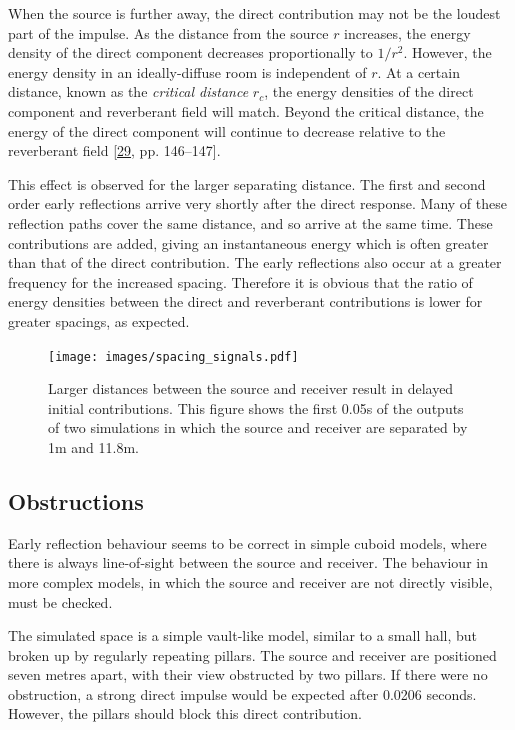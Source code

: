 \documentclass[]{scrreprt}
\begin{document}
When the source is further away, the direct contribution may not be the
loudest part of the impulse. As the distance from the source \(r\)
increases, the energy density of the direct component decreases
proportionally to \(1/r^2\). However, the energy density in an
ideally-diffuse room is independent of \(r\). At a certain distance,
known as the \emph{critical distance} \(r_c\), the energy densities of
the direct component and reverberant field will match. Beyond the
critical distance, the energy of the direct component will continue to
decrease relative to the reverberant field
{[}\protect\hyperlink{ref-kuttruffux5froomux5f2009}{29}, pp.
146--147{]}.

This effect is observed for the larger separating distance. The first
and second order early reflections arrive very shortly after the direct
response. Many of these reflection paths cover the same distance, and so
arrive at the same time. These contributions are added, giving an
instantaneous energy which is often greater than that of the direct
contribution. The early reflections also occur at a greater frequency
for the increased spacing. Therefore it is obvious that the ratio of
energy densities between the direct and reverberant contributions is
lower for greater spacings, as expected.

\begin{figure}[htbp]
\centering
\texttt{[image: images/spacing\_signals.pdf]}
\caption{Larger distances between the source and receiver result in
delayed initial contributions. This figure shows the first 0.05s of the
outputs of two simulations in which the source and receiver are
separated by 1m and 11.8m.\label{fig:spacing_signals}}
\end{figure}

\subsection{Obstructions}\label{obstructions}

Early reflection behaviour seems to be correct in simple cuboid models,
where there is always line-of-sight between the source and receiver. The
behaviour in more complex models, in which the source and receiver are
not directly visible, must be checked.

The simulated space is a simple vault-like model, similar to a small
hall, but broken up by regularly repeating pillars. The source and
receiver are positioned seven metres apart, with their view obstructed
by two pillars. If there were no obstruction, a strong direct impulse
would be expected after 0.0206 seconds. However, the pillars should
block this direct contribution.
\end{document}
